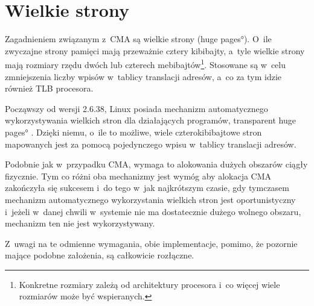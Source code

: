 \section{Wielkie strony}

Zagadnieniem związanym z~CMA są wielkie strony (\ang{huge pages}).
O~ile zwyczajne strony pamięci mają przeważnie cztery kibibajty,
a~tyle wielkie strony mają rozmiary rzędu dwóch lub czterech
mebibajtów\footnote{Konkretne rozmiary zależą od architektury
  procesora i~co więcej wiele rozmiarów może być wspieranych.}.
Stosowane są w~celu zmniejszenia liczby wpisów w~tablicy translacji
adresów, a~co za tym idzie również TLB procesora.

Począwszy od wersji 2.6.38, Linux posiada mechanizm automatycznego
wykorzystywania wielkich stron dla działających programów,
\ang{transparent huge pages} \cite{bib:v2.6.38}.  Dzięki niemu,
o~ile to możliwe, wiele czterokibibajtowe stron mapowanych jest za
pomocą pojedynczego wpisu w~tablicy translacji adresów.

Podobnie jak w~przypadku CMA, wymaga to alokowania dużych obszarów
ciągły fizycznie.  Tym co różni oba mechanizmy jest wymóg aby alokacja
CMA zakończyła się sukcesem i~do tego w~jak najkrótszym czasie, gdy
tymczasem mechanizm automatycznego wykorzystania wielkich stron jest
oportunistyczny i~jeżeli w~danej chwili w~systemie nie ma dostatecznie
dużego wolnego obszaru, mechanizm ten nie jest wykorzystywany.

Z~uwagi na te odmienne wymagania, obie implementacje, pomimo, że
pozornie mające podobne założenia, są całkowicie rozłączne.
